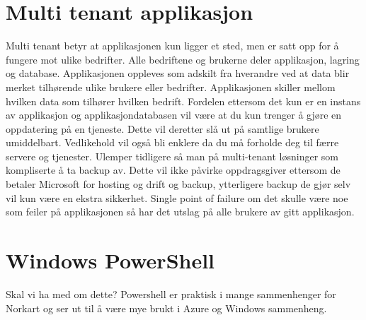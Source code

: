 \section*{Multi tenant applikasjon}
\label{sec:multiTenantApplikajson}
Multi tenant betyr at applikasjonen kun ligger et sted, men er satt opp for å fungere mot ulike bedrifter. Alle bedriftene og brukerne deler applikasjon, lagring og database. Applikasjonen oppleves som adskilt fra hverandre ved at data blir merket tilhørende ulike brukere eller bedrifter. Applikasjonen skiller mellom hvilken data som tilhører hvilken bedrift. Fordelen ettersom det kun er en instans av applikasjon og applikasjondatabasen vil være at du kun trenger å gjøre en oppdatering på en tjeneste. Dette vil deretter slå ut på samtlige brukere umiddelbart. Vedlikehold vil også bli enklere da du må forholde deg til færre servere og tjenester. Ulemper tidligere så man på multi-tenant løsninger som kompliserte å ta backup av. Dette vil ikke påvirke oppdragsgiver ettersom de betaler Microsoft for hosting og drift og backup, ytterligere backup de gjør selv vil kun være en ekstra sikkerhet. Single point of failure om det skulle være noe som feiler på applikasjonen så har det utslag på alle brukere av gitt applikasjon.

\section{Windows PowerShell}
\label{sec:teoridel_windows_powershell}
Skal vi ha med om dette? Powershell er praktisk i mange sammenhenger for Norkart og ser ut til å være mye brukt i Azure og Windows sammenheng.
